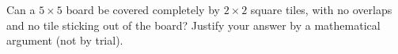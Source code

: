 Can a $5\times5$ board be covered completely by $2\times2$ square tiles, with no overlaps and no tile sticking out of the board? Justify your answer by a mathematical argument (not by trial).
